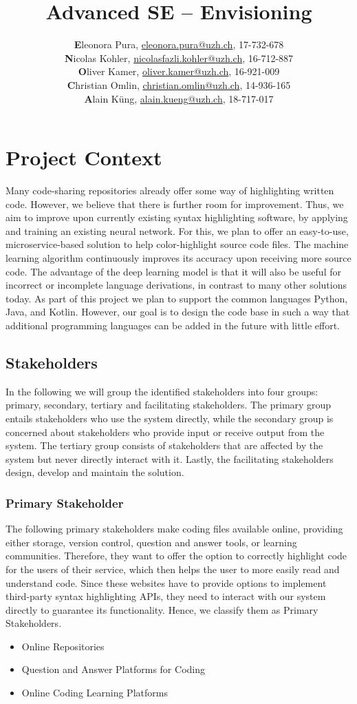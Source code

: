 \documentclass[11pt]{article}
\title{Advanced SE -- Envisioning}
\author{\begin{minipage}{0.655\linewidth}
\textbf{E}leonora Pura, \url{eleonora.pura@uzh.ch}, 17-732-678\\
\textbf{N}icolas Kohler, \url{nicolasfazli.kohler@uzh.ch}, 16-712-887\\
\textbf{O}liver Kamer, \url{oliver.kamer@uzh.ch}, 16-921-009\\
\textbf{C}hristian Omlin, \url{christian.omlin@uzh.ch}, 14-936-165\\
\textbf{A}lain Küng, \url{alain.kueng@uzh.ch}, 18-717-017\\
\end{minipage}}
\begin{document}
\maketitle

\setcounter{tocdepth}{1} %

\tableofcontents

\section{Project Context}
Many code-sharing repositories already offer some way of highlighting written code. However, we believe that there is further room for improvement. Thus, we aim to improve upon currently existing syntax highlighting software, by applying and training an existing neural network. For this, we plan to offer an easy-to-use, microservice-based solution to help color-highlight source code files. The machine learning algorithm continuously improves its accuracy upon receiving more source code. The advantage of the deep learning model is that it will also be useful for incorrect or incomplete language derivations, in contrast to many other solutions today. As part of this project we plan to support the common languages Python, Java, and Kotlin. However, our goal is to design the code base in such a way that additional programming languages can be added in the future with little effort.

\subsection{Stakeholders}
In the following we will group the identified stakeholders into four groups: primary, secondary, tertiary and facilitating stakeholders. The primary group entails stakeholders who use the system directly, while the secondary group is concerned about stakeholders who provide input or receive output from the system. The tertiary group consists of stakeholders that are affected by the system but never directly interact with it. Lastly, the facilitating stakeholders design, develop and maintain the solution.

\subsubsection*{Primary Stakeholder}
The following primary stakeholders make coding files available online, providing either storage, version control, question and answer tools, or learning communities. Therefore, they want to offer the option to correctly highlight code for the users of their service, which then helps the user to more easily read and understand code. Since these websites have to provide options to implement third-party syntax highlighting APIs, they need to interact with our system directly to guarantee its functionality. Hence, we classify them as Primary Stakeholders.
\begin{itemize}
\item Online Repositories
\item Question and Answer Platforms for Coding
\item Online Coding Learning Platforms
\end{itemize}
\end{document}
